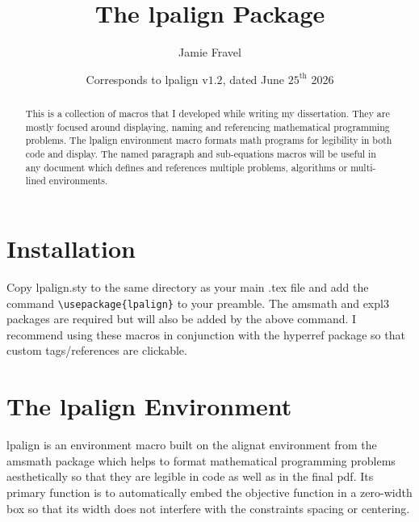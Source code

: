 \documentclass{article}
\title{The \textsf{lpalign} Package}
\date{Corresponds to \textsf{lpalign} v$1.2$, dated June $25^\textrm{th}$ 2026}
\author{Jamie Fravel}
\affil{jamiefravel@me.com}
\begin{document}
\maketitle
\begin{abstract}
    This is a collection of macros that I developed while writing my dissertation. They are mostly focused around displaying, naming and referencing mathematical programming problems. The \textsf{lpalign} environment macro formats math programs for legibility in both code and display. The named paragraph and  sub-equations macros will be useful in any document which defines and references multiple problems, algorithms or multi-lined environments. 
\end{abstract}

\tableofcontents

\section{Installation}

Copy \textsf{lpalign.sty} to the same directory as your main \textsf{.tex} file and add the command \verb|\usepackage{lpalign}| to your preamble. The \textsf{amsmath} and \textsf{expl3} packages are required but will also be added by the above command. I recommend using these macros in conjunction with the \textsf{hyperref} package so that custom tags/references are clickable.




\section{The \textsf{lpalign} Environment}

\textsf{lpalign} is an environment macro built on the \textsf{alignat} environment from the \textsf{amsmath} package which helps to format mathematical programming problems aesthetically so that they are legible in code as well as in the final pdf. Its primary function is to automatically embed the objective function in a zero-width box so that its width does not interfere with the constraints spacing or centering.
\end{document}
